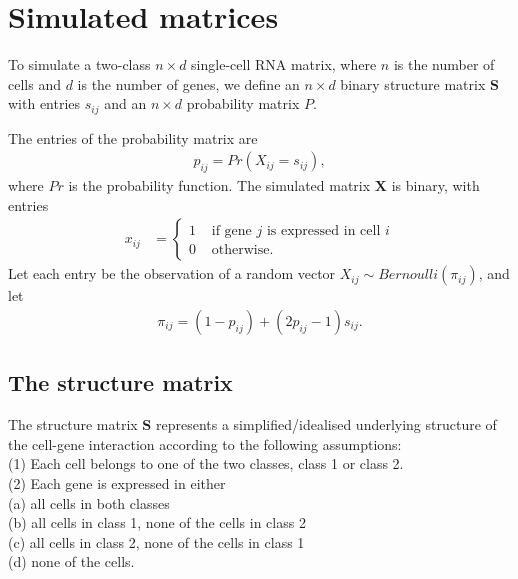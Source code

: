 \documentclass[12pt]{article}
\begin{document}
\newcommand{\cpos}{\text{\scriptsize{{\it POS}}}}
\newcommand{\cneg}{\text{\scriptsize{{\it NEG}}}}
\newcommand{\mb}{\mathbf}

\section{Simulated matrices} \label{sec:Sim} %

To simulate a two-class $n \times d$  single-cell RNA matrix, where $n$ is the number of cells and $d$ is the number of genes, we define an $n \times d$ binary structure matrix $\mathbf{S}$ with entries $s_{ij}$ and an $n \times d$ probability matrix $P$. 

The entries of the probability matrix are
\begin{align}
  p_{ij} = Pr(X_{ij} = s_{ij}),
\end{align}
where $Pr$ is the probability function. 
The simulated matrix $\mathbf{X}$ is binary, with entries
\begin{align}
  x_{ij} &= 
  \begin{cases}
   1 &  \text{ if gene $j$ is expressed in cell $i$} \\
   0 & \text{ otherwise.}
  \end{cases}
\end{align}
Let each entry be the observation of a random vector $X_{ij} \sim Bernoulli(\pi_{ij})$, and let 
\begin{align}
  \pi_{ij} = (1 -  p_{ij}) + (2  p_{ij} - 1) s_{ij}.
\end{align}

\subsection{The structure matrix} \label{sec:Struct} %

The structure matrix $\mathbf{S}$ represents a simplified/idealised underlying structure of the cell-gene interaction according to the following assumptions:\\
(1) Each cell belongs to one of the two classes, class 1 or class 2.\\
(2) Each gene is expressed in either \\
\indent (a) all cells in both classes \\
\indent (b) all cells in class 1,  none of the cells in class 2 \\
 \indent (c) all cells in class 2, none of the cells in class 1 \\
 \indent (d) none of the cells.
\end{document}
